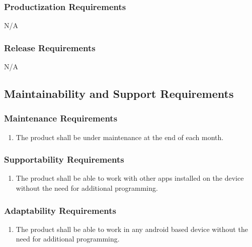\documentclass[]{article}
\begin{document}
\subsubsection{Productization Requirements}
\label{ssub:productization_requirements}
N/A

\subsubsection{Release Requirements}
\label{ssub:release_requirements}
N/A


\subsection{Maintainability and Support Requirements}
\label{sub:maintainability_and_support_requirements}

\subsubsection{Maintenance Requirements}
\label{ssub:maintenance_requirements}
\begin{enumerate}[{MS}1. ]
	\item The product shall be under maintenance at the end of each month.
\end{enumerate}

\subsubsection{Supportability Requirements}
\label{ssub:supportability_requirements}
\begin{enumerate}[{MS}2. ]
	\item The product shall be able to work with other apps installed on the device without the need for additional programming.
\end{enumerate}

\subsubsection{Adaptability Requirements}
\label{ssub:adaptability_requirements}
\begin{enumerate}[{MS}3. ]
	\item The product shall be able to work in any android based device without the need for additional programming.
\end{enumerate}
\end{document}
